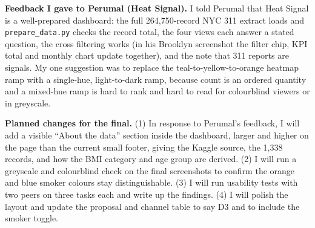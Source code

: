 \documentclass[11pt]{article}
\begin{document}
\textbf{Feedback I gave to Perumal (Heat Signal).} I told Perumal that Heat Signal is a well-prepared dashboard: the full 264,750-record NYC 311 extract loads and \texttt{prepare\_data.py} checks the record total, the four views each answer a stated question, the cross filtering works (in his Brooklyn screenshot the filter chip, KPI total and monthly chart update together), and the note that 311 reports are signals. My one suggestion was to replace the teal-to-yellow-to-orange heatmap ramp with a single-hue, light-to-dark ramp, because count is an ordered quantity and a mixed-hue ramp is hard to rank and hard to read for colourblind viewers or in greyscale.

\textbf{Planned changes for the final.} (1) In response to Perumal's feedback, I will add a visible ``About the data'' section inside the dashboard, larger and higher on the page than the current small footer, giving the Kaggle source, the 1,338 records, and how the BMI category and age group are derived. (2) I will run a greyscale and colourblind check on the final screenshots to confirm the orange and blue smoker colours stay distinguishable. (3) I will run usability tests with two peers on three tasks each and write up the findings. (4) I will polish the layout and update the proposal and channel table to say D3 and to include the smoker toggle.
\end{document}
